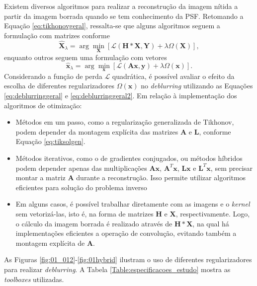 Existem diversos algoritmos para realizar a reconstrução da imagem nítida a partir da imagem borrada quando se tem conhecimento da PSF. Retomando a Equação \eqref{eq:tikhonovgeral}, ressalta-se que alguns algoritmos seguem a formulação com matrizes conforme
\begin{equation}
\hat{\mathbf{X}}_{\lambda} = \arg\min\limits_{\mathbf{X}} \left[ \mathcal{L} \left(\mathbf{H}*\mathbf{X}, \mathbf{Y} \right) + \lambda \Omega(\mathbf{X}) \right],
 \label{eq:deblurringgeral}
\end{equation}
enquanto outros seguem uma formulação com vetores 
\begin{equation}
\hat{\mathbf{x}}_{\lambda} = \arg\min\limits_{\mathbf{x}} \left[ \mathcal{L} \left(\mathbf{A}\mathbf{x}, \mathbf{y} \right) + \lambda \Omega(\mathbf{x}) \right].
 \label{eq:deblurringgeral2}
\end{equation}
Considerando a função de perda $ \mathcal{L}$ quadrática, é possível avaliar o efeito da escolha de diferentes regularizadores $\Omega(\mathbf{x})$ no \textit{deblurring} utilizando as Equações \eqref{eq:deblurringgeral} e \eqref{eq:deblurringgeral2}. Em relação à implementação dos algoritmos de otimização:

\begin{itemize}
\item Métodos em um passo, como a regularização generalizada de Tikhonov, podem depender da montagem explícita das matrizes $\mathbf{A}$ e $\mathbf{L}$, conforme Equação \eqref{eq:tiksolgen}. 
\item Métodos iterativos, como o de gradientes conjugados, ou métodos híbridos podem depender apenas das multiplicações $\mathbf{A}\mathbf{x}$, $\mathbf{A}^T\mathbf{x}$, $\mathbf{L}\mathbf{x}$ e $\mathbf{L}^T\mathbf{x}$, sem precisar montar a matriz $\mathbf{A}$ durante a reconstrução. Isso permite utilizar algoritmos eficientes para solução do problema inverso
\item Em alguns casos, é possível trabalhar diretamente com as imagens e o \textit{kernel} sem vetorizá-las, isto é,  na forma de matrizes $\mathbf{H}$ e $\mathbf{X}$, respectivamente. Logo, o cálculo da imagem borrada é realizado através de $\mathbf{H}*\mathbf{X}$, na qual há implementações eficientes a operação de convolução, evitando também a montagem explícita de $\mathbf{A}$. 
\end{itemize}

As Figuras \ref{fig:01_012}-\ref{fig:01hybrid} ilustram o uso de diferentes regularizadores para realizar \textit{deblurring}. A Tabela \ref{Table:especificacoes_estudo} mostra as \textit{toolboxes} utilizadas.

